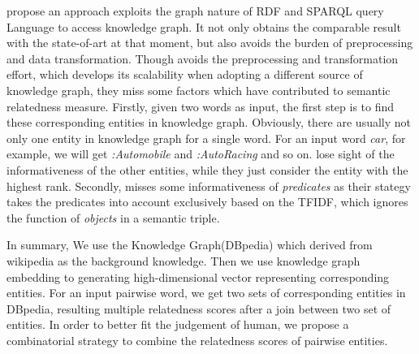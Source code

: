 \cite{aaai/Pirro12} propose an approach exploits the graph nature of RDF and SPARQL query
Language to access knowledge graph. It not only obtains the comparable
result with the state-of-art at that moment, but also avoids the burden
of preprocessing and data transformation.
Though \cite{aaai/Pirro12} avoids the preprocessing and transformation effort,
which develops its scalability when adopting a
different source of knowledge graph, they miss some factors which
have contributed to semantic relatedness measure. Firstly, given two words
as input, the first step is to find these corresponding entities in knowledge
graph. Obviously, there are usually not only one entity in knowledge graph for a single
word. For an input word \emph{car}, for example, we will get \emph{:Automobile} and
\emph{:Auto\underline{\hspace{0.5em}}Racing} and so on. \cite{aaai/Pirro12} lose
sight of the informativeness of the other entities, while they just
consider the entity with the highest rank. Secondly, \cite{aaai/Pirro12} misses
some informativeness of \emph{predicates} as their stategy takes
the predicates into account exclusively based on the TFIDF,
which ignores the function of \emph{objects} in a semantic triple.

In summary, We use the Knowledge Graph(DBpedia) which derived from wikipedia as the background knowledge.
Then we use knowledge graph embedding to generating high-dimensional vector representing corresponding
entities. For an input pairwise word, we get two sets of corresponding entities in DBpedia, resulting multiple
relatedness scores after a join between two set of entities.
In order to better fit the judgement of human, we propose a combinatorial strategy to combine
the relatedness scores of pairwise entities.